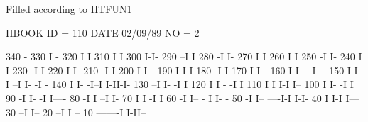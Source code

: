 \begin{minipage}[t]{.495\textwidth}
\begin{XMPfrac}{3.2}
Filled according to HTFUN1
 
HBOOK     ID =       110                                        DATE  02/09/89               NO =  2
 
     340                                    -
     330                                    I -
     320                                    I I
     310                                    I I
     300                                    I-I-
     290                                  --I  I
     280                                 -I    I-
     270                                 I      I
     260                                 I      I
     250                                -I      I-
     240                                I        I
     230                               -I        I
     220                               I         I-
     210                              -I          I
     200                              I           I -
     190                              I           I-I
     180                             -I             I
     170                             I              I                                -
     160                             I              I                          -    -I-   -
     150                             I              I-                         I  --I I- -I -
     140                             I               I-                       -I--I    I-II-I-
     130                           --I                I-                     -I              I
     120                           I                   I                  - -I               I
     110                           I                   I                  I-I                I--
     100                           I                   I-                -I                    I
      90                          -I                    I-              -I                     I----
      80                         -I                      I            --I                          I-
      70                         I                       I           -I                             I
      60                        -I                       I--       - I                              I- -
      50                       -I                          I-- ----I-I                               I-I-
      40                       I                             I-I                                        I---
      30                     --I                                                                           I--
      20                   --I                                                                               I --
      10            -------I                                                                                 I-II--
 

\end{XMPfrac}
\end{minipage}
